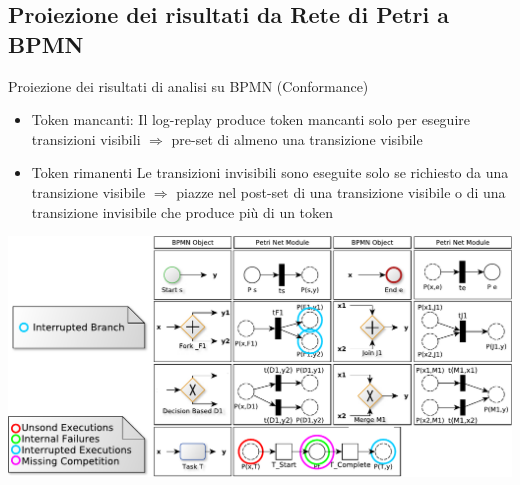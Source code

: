 \documentclass[10pt]{beamer}
\begin{document}
\subsection{Proiezione dei risultati da Rete di Petri a BPMN}
\begin{frame}{}
  \begin{block}{Proiezione dei risultati di analisi su BPMN (Conformance)}
    \begin{itemize}
      \item \alert{Token mancanti}: Il log-replay produce token mancanti solo per eseguire transizioni visibili  $\Rightarrow$ pre-set di almeno una transizione visibile
      \item \alert{Token rimanenti} Le transizioni invisibili sono eseguite solo se richiesto da una transizione visibile $\Rightarrow$ 
        piazze nel  post-set di una transizione visibile  o di una transizione invisibile che produce pi\`{u} di un token

    \end{itemize}
  \end{block}
  
  \begin{center}
    \includegraphics[scale=0.40]{./fig/MappingBPMNtoPN2}
  \end{center}

\end{frame}

\end{document}
